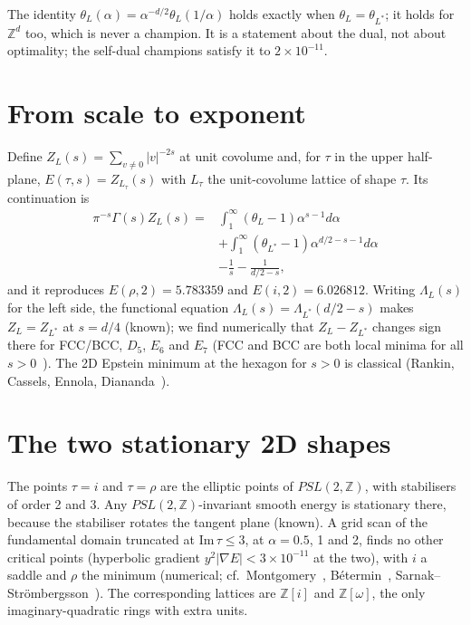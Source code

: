 \documentclass[aps,prd,twocolumn,superscriptaddress,nofootinbib,showkeys]{revtex4-2}
\begin{document}
The identity $\theta_L(\alpha)=\alpha^{-d/2}\theta_L(1/\alpha)$ holds exactly when $\theta_L=\theta_{L^*}$; it holds for $\mathbb Z^d$ too, which is never a champion. It is a statement about the dual, not about optimality; the self-dual champions satisfy it to $2\times10^{-11}$.

\section{From scale to exponent}
Define $Z_L(s)=\sum_{v\ne0}|v|^{-2s}$ at unit covolume and, for $\tau$ in the upper half-plane, $E(\tau,s)=Z_{L_\tau}(s)$ with $L_\tau$ the unit-covolume lattice of shape $\tau$. Its continuation is
\begin{align}
\pi^{-s}\Gamma(s)Z_L(s)={}&\int_1^\infty(\theta_L-1)\alpha^{s-1}d\alpha\nonumber\\
&+\int_1^\infty(\theta_{L^*}-1)\alpha^{d/2-s-1}d\alpha\nonumber\\
&-\frac1s-\frac{1}{d/2-s},
\end{align}
and it reproduces $E(\rho,2)=5.783359$ and $E(i,2)=6.026812$. Writing $\Lambda_L(s)$ for the left side, the functional equation $\Lambda_L(s)=\Lambda_{L^*}(d/2-s)$ makes $Z_L=Z_{L^*}$ at $s=d/4$ (known); we find numerically that $Z_L-Z_{L^*}$ changes sign there for FCC/BCC, $D_5$, $E_6$ and $E_7$ (FCC and BCC are both local minima for all $s>0$~\cite{Enn}). The 2D Epstein minimum at the hexagon for $s>0$ is classical (Rankin, Cassels, Ennola, Diananda~\cite{Ran,Cas,Enn2,Dia}).

\section{The two stationary 2D shapes}
The points $\tau=i$ and $\tau=\rho$ are the elliptic points of $PSL(2,\mathbb Z)$, with stabilisers of order 2 and 3. Any $PSL(2,\mathbb Z)$-invariant smooth energy is stationary there, because the stabiliser rotates the tangent plane (known). A grid scan of the fundamental domain truncated at $\mathrm{Im}\,\tau\le3$, at $\alpha=0.5$, 1 and 2, finds no other critical points (hyperbolic gradient $y^2|\nabla E|<3\times10^{-11}$ at the two), with $i$ a saddle and $\rho$ the minimum (numerical; cf.\ Montgomery~\cite{Mon}, B\'etermin~\cite{Bet}, Sarnak--Str\"ombergsson~\cite{SS}). The corresponding lattices are $\mathbb Z[i]$ and $\mathbb Z[\omega]$, the only imaginary-quadratic rings with extra units.
\end{document}
